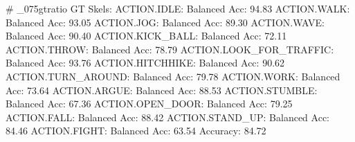 # _075gtratio
GT Skels:
ACTION.IDLE: Balanced Acc: 94.83%
ACTION.WALK: Balanced Acc: 93.05%
ACTION.JOG: Balanced Acc: 89.30%
ACTION.WAVE: Balanced Acc: 90.40%
ACTION.KICK_BALL: Balanced Acc: 72.11%
ACTION.THROW: Balanced Acc: 78.79%
ACTION.LOOK_FOR_TRAFFIC: Balanced Acc: 93.76%
ACTION.HITCHHIKE: Balanced Acc: 90.62%
ACTION.TURN_AROUND: Balanced Acc: 79.78%
ACTION.WORK: Balanced Acc: 73.64%
ACTION.ARGUE: Balanced Acc: 88.53%
ACTION.STUMBLE: Balanced Acc: 67.36%
ACTION.OPEN_DOOR: Balanced Acc: 79.25%
ACTION.FALL: Balanced Acc: 88.42%
ACTION.STAND_UP: Balanced Acc: 84.46%
ACTION.FIGHT: Balanced Acc: 63.54%
Accuracy: 84.72%


